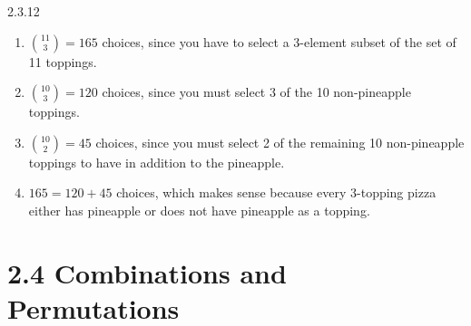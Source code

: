 \documentclass[11pt,]{book}
\theoremstyle{ptxplainnotitle}
\theoremstyle{ptxplaintitle}
\theoremstyle{ptxdefinitionnotitle}
\theoremstyle{ptxdefinitiontitle}
\theoremstyle{ptxdefinitionnotitle}
\theoremstyle{ptxdefinitiontitle}
\theoremstyle{ptxdefinitionnotitle}
\theoremstyle{ptxdefinitiontitle}
\theoremstyle{ptxdefinitiontitlenonumber}
\theoremstyle{ptxdefinitiontitlenonumber}
\numberwithin{equation}{chapter}
\begin{document}
\begin{divisionexercise}{2.3.12}
\textbf{}\hypertarget{p-1442}{}%
\leavevmode%
\begin{enumerate}[label=(\alph*)]
\item\hypertarget{li-633}{}\hypertarget{p-1443}{}%
\({11 \choose 3} = 165\) choices, since you have to select a 3-element subset of the set of 11 toppings.%
\item\hypertarget{li-634}{}\hypertarget{p-1444}{}%
\({10 \choose 3} = 120\) choices, since you must select 3 of the 10 non-pineapple toppings.%
\item\hypertarget{li-635}{}\hypertarget{p-1445}{}%
\({10 \choose 2} = 45\) choices, since you must select 2 of the remaining 10 non-pineapple toppings to have in addition to the pineapple.%
\item\hypertarget{li-636}{}\hypertarget{p-1446}{}%
\(165  = 120 + 45\) choices, which makes sense because every 3-topping pizza either has pineapple or does not have pineapple as a topping.%
\end{enumerate}
%
\end{divisionexercise}%
\section*{2.4 Combinations and Permutations}
\end{document}
